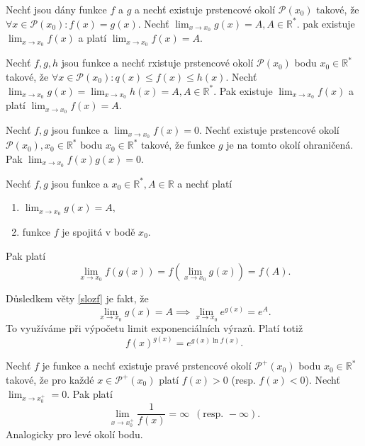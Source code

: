 \begin{veta}
Nechť jsou dány funkce $f$ a $g$ a nechť existuje prstencové okolí
$\mathscr P(x_0)$ takové, že $\forall x \in \mathscr P(x_0):f(x)=g(x).$
Nechť $\lim_{x\to x_0}g(x)=A, A\in \mathbb R^*.$ pak existuje $\lim_{x\to x_0}f(x)$
a platí $\lim_{x\to x_0}f(x)=A.$
\end{veta}

\begin{veta}
Nechť $f,g,h$ jsou funkce a nechť rxistuje prstencové okolí $\mathscr P(x_0)$
bodu $x_0\in \mathbb R^*$ takové, že $\forall x \in \mathscr P(x_0):q(x)\leq f(x)\leq h(x).$
Nechť $\lim_{x\to x_0}g(x)=\lim_{x\to x_0}h(x)=A, A \in \mathbb R^*.$ Pak existuje
$\lim_{x\to x_0}f(x)$ a  platí $ \lim_{x\to x_0}f(x) = A.$
\end{veta}

\begin{veta}
Nechť $f,g$ jsou funkce a $\lim_{x\to x_0}f(x)=0.$ Nechť existuje prstencové
okolí $\mathscr P(x_0), x_0\in \mathbb R^*$ bodu $x_0\in \mathbb R^*$ takové, že
funkce $g$ je na tomto okolí ohraničená. Pak $\lim_{x\to x_0}f(x)g(x)=0.$
\end{veta}

\begin{veta}\label{slozf}
Nechť $f,g$ jsou funkce a $x_0\in \mathbb R^*, A \in \mathbb R$ a nechť platí
\begin{enumerate}[$i.$]
\item $\lim_{x\to x_0}g(x)=A,$
\item funkce $f$ je spojitá v bodě $x_0.$
\end{enumerate}
Pak platí
$$\lim_{x\to x_0}f \left ( g(x) \right ) =f \left ( \lim_{x\to x_0}g(x) \right ) =f(A).$$
\end{veta}

\begin{pozn}
    Důsledkem věty \ref{slozf} je fakt, že
    $$\lim_{x\to x_0}g(x)=A \implies \lim_{x\to x_0}e^{g(x)}=e^A.$$
    To využíváme při výpočetu limit exponenciálních výrazů. Platí totiž
    $$f(x)^{g(x)}=e^{g(x)\ln f(x)}.$$
\end{pozn}

\begin{veta}
Nechť $f$ je funkce a nechť existuje pravé prstencové okolí $\mathscr P^+(x_0)$ bodu
$x_0\in \mathbb R^*$ takové, že pro každé $x\in \mathscr P^+(x_0)$ platí
$f(x)>0$ (resp. $f(x)<0$). Nechť $\lim_{x\to x_0^+}=0.$ Pak platí
$$\lim_{x\to x_0^+} \frac{1}{f(x)}=\infty \,\,\, (\textrm{resp. } -\infty).$$
Analogicky pro levé okolí bodu.
\end{veta}

